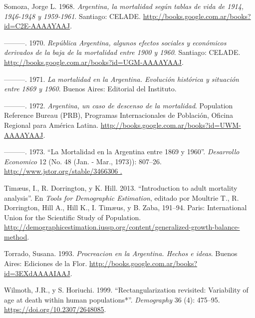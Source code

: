 \documentclass[12pt,spanish,]{article}
\begin{document}
\leavevmode\hypertarget{ref-Somoza1968}{}%
Somoza, Jorge L. 1968. \emph{Argentina, la mortalidad según tablas de
vida de 1914, 1946-1948 y 1959-1961}. Santiago: CELADE.
\url{http://books.google.com.ar/books?id=C2E-AAAAYAAJ}.

\leavevmode\hypertarget{ref-Somoza1970}{}%
---------. 1970. \emph{República Argentina, algunos efectos sociales y
económicos derivados de la baja de la mortalidad entre 1900 y 1960}.
Santiago: CELADE.
\url{http://books.google.com.ar/books?id=UGM-AAAAYAAJ}.

\leavevmode\hypertarget{ref-Somoza1971}{}%
---------. 1971. \emph{La mortalidad en la Argentina. Evolución
histórica y situación entre 1869 y 1960}. Buenos Aires: Editorial del
Instituto.

\leavevmode\hypertarget{ref-Somoza1972}{}%
---------. 1972. \emph{Argentina, un caso de descenso de la mortalidad}.
Population Reference Bureau (PRB), Programas Internacionales de
Población, Oficina Regional para América Latina.
\url{http://books.google.com.ar/books?id=UWM-AAAAYAAJ}.

\leavevmode\hypertarget{ref-Somoza1973}{}%
---------. 1973. ``La Mortalidad en la Argentina entre 1869 y 1960''.
\emph{Desarrollo Economico} 12 (No. 48 (Jan. - Mar., 1973)): 807--26.
\href{http://www.jstor.org/stable/3466306\%20.}{http://www.jstor.org/stable/3466306 .}

\leavevmode\hypertarget{ref-TimaeusDorringtonHill2013}{}%
Timæus, I., R. Dorrington, y K. Hill. 2013. ``Introduction to adult
mortality analysis''. En \emph{Tools for Demographic Estimation},
editado por Moultrie T., R. Dorrington, Hill A., Hill K., I. Timæus, y
B. Zaba, 191--94. Paris: International Union for the Scientific Study of
Population.
\href{\%20http://demographicestimation.iussp.org/content/generalized-growth-balance-method}{http://demographicestimation.iussp.org/content/generalized-growth-balance-method}.

\leavevmode\hypertarget{ref-Torrado1993}{}%
Torrado, Susana. 1993. \emph{Procreacion en la Argentina. Hechos e
ideas}. Buenos Aires: Ediciones de la Flor.
\url{http://books.google.com.ar/books?id=3EXdAAAAIAAJ}.

\leavevmode\hypertarget{ref-WilmothHoriuchi1999}{}%
Wilmoth, J.R., y S. Horiuchi. 1999. ``Rectangularization revisited:
Variability of age at death within human populations*''.
\emph{Demography} 36 (4): 475--95.
\url{https://doi.org/10.2307/2648085}.








\printunsrtglossaries
{}

\end{document}
